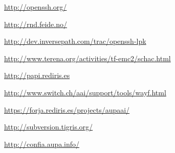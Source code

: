 
\newpage


\begin{thebibliography}{widest-label}

  \url{http://openssh.org/}

  \url{http://rnd.feide.no/}
 
  \url{http://dev.inversepath.com/trac/openssh-lpk}

  \url{http://www.terena.org/activities/tf-emc2/schac.html}
 
  \url{http://papi.rediris.es}

  \url{http://www.switch.ch/aai/support/tools/wayf.html}

  \url{https://forja.rediris.es/projects/aupaai/}

  \url{http://subversion.tigris.org/}

  \url{http://confia.aupa.info/}

\end{thebibliography}



